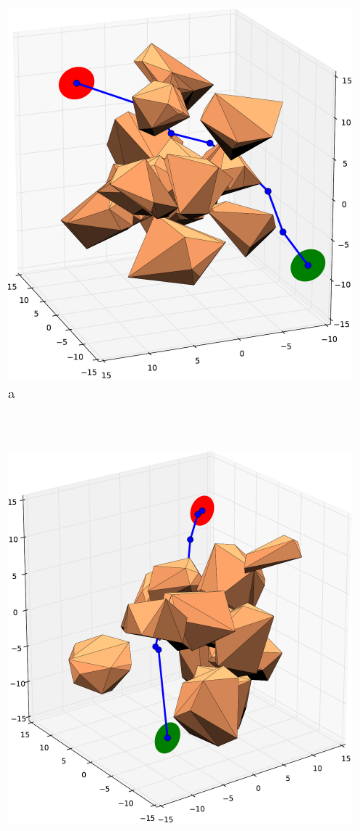 \documentclass[12pt]{article}
\begin{document}
\begin{figure}[t!]
    \centering
    \begin{subfigure}[t]{0.3\textwidth}
        \centering
        \includegraphics[width=\textwidth]{3d_example_1.pdf}
        \caption{a}
    \end{subfigure}%
    ~ 
    \begin{subfigure}[t]{0.3\textwidth}
        \centering
        \includegraphics[width=\textwidth]{3d_example_2.pdf}

\end{subfigure}
\end{figure}
\end{document}
